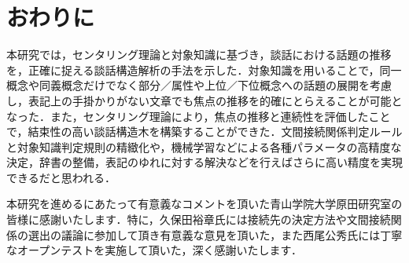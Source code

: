 \documentclass[japanese]{jnlp_1.4}
\begin{document}
\section{おわりに}

本研究では，センタリング理論と対象知識に基づき，談話における話題の推移を，正確に捉える談話構造解析の手法を示した．対象知識を用いることで，同一概念や同義概念だけでなく部分／属性や上位／下位概念への話題の展開を考慮し，表記上の手掛かりがない文章でも焦点の推移を的確にとらえることが可能となった．また，センタリング理論により，焦点の推移と連続性を評価したことで，結束性の高い談話構造木を構築することができた．文間接続関係判定ルールと対象知識判定規則の精緻化や，機械学習などによる各種パラメータの高精度な決定，辞書の整備，表記のゆれに対する解決などを行えばさらに高い精度を実現できるだと思われる．




\acknowledgment

本研究を進めるにあたって有意義なコメントを頂いた青山学院大学原田研究室の皆様に感謝いたします．特に，久保田裕章氏には接続先の決定方法や文間接続関係の選出の議論に参加して頂き有意義な意見を頂いた，また西尾公秀氏には丁寧なオープンテストを実施して頂いた，深く感謝いたします．




\label{sec:mylabel19}
\end{document}
